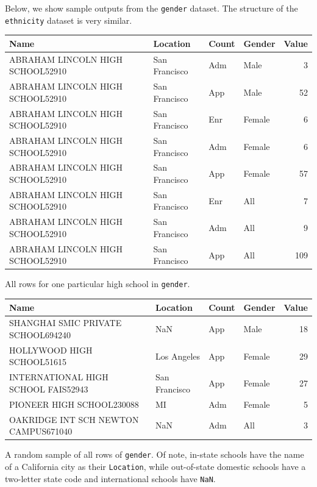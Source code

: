 \documentclass{article}
\begin{document}
Below, we show sample outputs from the \texttt{gender} dataset. The structure of the \texttt{ethnicity} dataset is very similar.

\begin{tabular}{llllr}
\toprule
                             Name &       Location & Count &  Gender &  Value \\
\midrule
 ABRAHAM LINCOLN HIGH SCHOOL52910 &  San Francisco &   Adm &    Male &      3 \\
 ABRAHAM LINCOLN HIGH SCHOOL52910 &  San Francisco &   App &    Male &     52 \\
 ABRAHAM LINCOLN HIGH SCHOOL52910 &  San Francisco &   Enr &  Female &      6 \\
 ABRAHAM LINCOLN HIGH SCHOOL52910 &  San Francisco &   Adm &  Female &      6 \\
 ABRAHAM LINCOLN HIGH SCHOOL52910 &  San Francisco &   App &  Female &     57 \\
 ABRAHAM LINCOLN HIGH SCHOOL52910 &  San Francisco &   Enr &     All &      7 \\
 ABRAHAM LINCOLN HIGH SCHOOL52910 &  San Francisco &   Adm &     All &      9 \\
 ABRAHAM LINCOLN HIGH SCHOOL52910 &  San Francisco &   App &     All &    109 \\
\bottomrule
\end{tabular}
All rows for one particular high school in \texttt{gender}.

\begin{tabular}{llllr}
\toprule
                                 Name &       Location & Count &  Gender &  Value \\
\midrule
   SHANGHAI SMIC PRIVATE SCHOOL694240 &            NaN &   App &    Male &     18 \\
           HOLLYWOOD HIGH SCHOOL51615 &    Los Angeles &   App &  Female &     29 \\
  INTERNATIONAL HIGH SCHOOL FAIS52943 &  San Francisco &   App &  Female &     27 \\
            PIONEER HIGH SCHOOL230088 &             MI &   Adm &  Female &      5 \\
 OAKRIDGE INT SCH NEWTON CAMPUS671040 &            NaN &   Adm &     All &      3 \\
\bottomrule
\end{tabular}
A random sample of all rows of \texttt{gender}. Of note, in-state schools have the name of a California city as their \texttt{Location}, while out-of-state domestic schools have a two-letter state code and international schools have \texttt{NaN}.
\end{document}

